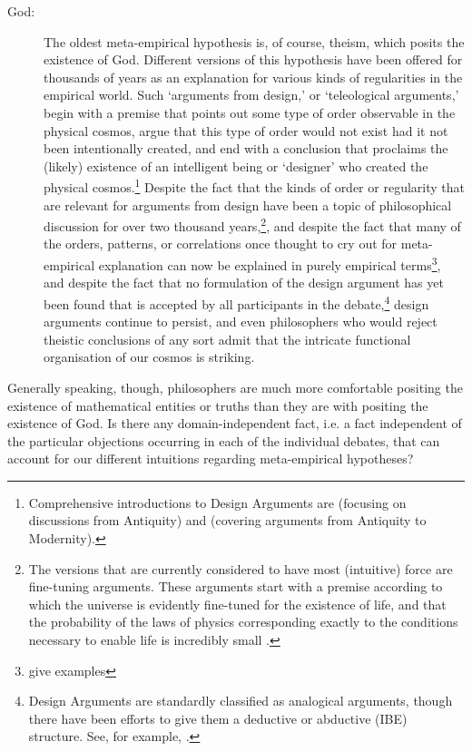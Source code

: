 \documentclass[a4paper,12pt]{article}
\begin{document}
\begin{description}
\item[God:] The oldest meta-empirical hypothesis is, of course, theism, which posits the existence of God. Different versions of this hypothesis have been offered for thousands of years as an explanation for various kinds of regularities in the empirical world. Such `arguments from design,' or `teleological arguments,' begin with a premise that points out some type of order observable in the physical cosmos, argue that this type of order would not exist had it not been intentionally created, and end with a conclusion that proclaims the (likely) existence of an intelligent being or `designer' who created the physical cosmos.\footnote{Comprehensive introductions to Design Arguments are \cite{Sedley2007} (focusing on discussions from Antiquity) and \cite{Jantzen2014} (covering arguments from Antiquity to Modernity).} 
Despite the fact that the kinds of order or regularity that are relevant for arguments from design have been a topic of philosophical discussion for over two thousand years,\footnote{The versions that are currently considered to have most (intuitive) force are fine-tuning arguments. These arguments start with a premise according to which the universe is evidently fine-tuned for the existence of life, and that the probability of the laws of physics corresponding exactly to the conditions necessary to enable life is incredibly small \cite{x}.}, and despite the fact that many of the orders, patterns, or correlations once thought to cry out for meta-empirical explanation can now be explained in purely empirical terms\footnote{give examples}, and despite the fact that no formulation of the design argument has yet been found that is accepted by all participants in the debate,\footnote{Design Arguments are standardly classified as analogical arguments, though there have been efforts to give them a deductive or abductive (IBE) structure. See, for example, \cite{x}.} design arguments continue to persist, and even philosophers who would reject theistic conclusions of any sort admit that the intricate functional organisation of our cosmos is striking.

\end{description}

Generally speaking, though, philosophers are much more comfortable positing the existence of mathematical entities or truths than they are with positing the existence of God. Is there any domain-independent fact, i.e. a fact independent of the particular objections occurring in each of the individual debates, that can account for our different intuitions regarding meta-empirical hypotheses?
\end{document}
